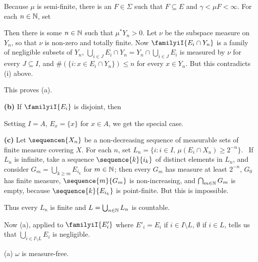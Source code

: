 {Because $\mu$ is semi-finite, there is an $F\in\Sigma$ such that
$F\subseteq E$ and $\gamma<\mu F<\infty$.   For each $n\in\Bbb N$, set


\noindent Then there is some $n\in\Bbb N$ such that $\mu^*Y_n>0$.   Let
$\nu$ be the subspace measure on $Y_n$, so that $\nu$ is non-zero and
totally finite.   Now
$\familyiI{E_i\cap Y_n}$ is a family of negligible subsets of $Y_n$,
$\bigcup_{i\in J}E_i\cap Y_n=Y_n\cap\bigcup_{i\in J}E_i$ is measured by
$\nu$ for every $J\subseteq I$, and $\#(\{i:x\in E_i\cap Y_n\})\le n$
for every $x\in Y_n$.   But this contradicts (i) above.\ \Bang

This proves (a).

\medskip

{\bf (b)} If $\familyiI{E_i}$ is disjoint, then


\noindent Setting $I=A$, $E_x=\{x\}$ for $x\in A$, we get the special
case.

\medskip

{\bf (c)} Let
$\sequencen{X_n}$ be a non-decreasing sequence of measurable sets of
finite measure covering $X$.  For each $n$, set
$L_n=\{i:i\in I,\,\mu(E_i\cap X_n)\ge 2^{-n}\}$.   \Quer\ If $L_n$ is
infinite, take a
sequence $\sequence{k}{i_k}$ of distinct elements in $L_n$, and consider
$G_m=\bigcup_{k\ge m}E_{i_k}$ for $m\in\Bbb N$;  then every $G_m$ has
measure at least $2^{-n}$, $G_0$ has finite measure, $\sequence{m}{G_m}$
is non-increasing, and $\bigcap_{m\in\Bbb N}G_m$ is empty, because
$\sequence{k}{E_{i_k}}$ is point-finite.   But this is impossible.\
\Bang

Thus every $L_n$ is finite and $L=\bigcup_{n\in\Bbb N}L_n$ is
countable.

Now (a), applied to $\familyiI{E'_i}$ where $E'_i=E_i$ if
$i\in I\setminus L$, $\emptyset$ if $i\in L$, tells us that
$\bigcup_{i\in I\setminus L}E_i$ is negligible.
}%

 (a) $\omega$ is
measure-free.

